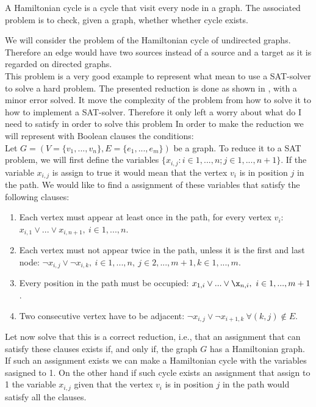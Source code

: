 \begin{definition}
  A Hamiltonian cycle is a cycle that visit every node in a graph. The associated problem is to check, given a graph, whether whether cycle exists.
\end{definition}

We will consider the problem of the Hamiltonian cycle of undirected graphs. Therefore an edge would have two sources instead of a source and a target as it is regarded on directed graphs.\\

This problem is a very good example to represent what mean to use a SAT-solver to solve a hard problem. The presented reduction is done as shown in \cite{49593}, with a minor error solved. It move the complexity of the problem from how to solve it to how to implement a SAT-solver. Therefore it only left a worry about what do I need to satisfy in order to solve this problem In order to make the reduction we will represent with Boolean clauses the conditions:\\

Let $G=(V=\{ v_1,...,v_n\},E= \{e_1,...,e_m\})$ be a graph. To reduce it to a SAT problem, we will first define the variables $\{x_{i,j}: i\in 1,...,n ; j\in 1,...,n+1 \}$. If the variable $x_{i,j}$ is assign to true it would mean that the vertex $v_i$ is in position $j$ in the path. We would like to find a assignment of these variables that satisfy the following clauses:

\begin{enumerate}
\item Each vertex must appear at least once in the path, for every vertex $v_i$:
  $ x_{i,1} \vee ... \vee x_{i,n +1},\ i \in 1,...,n$.
\item Each vertex must not appear twice in the path, unless it is the first and last node: $\neg x_{i,j} \vee \neg x_{i,k},\ i \in 1,...,n ,\ j \in 2,...,m+1, k \in 1,...,m$.
\item Every position in the path must be occupied:   $ x_{1,i} \vee ... \vee \x_{n,i},\ i \in 1,...,m+1$.
\item Two consecutive vertex have to be adjacent: $\neg x_{i,j} \vee \neg x_{i+1,k}\ \forall (k,j) \not \in E$.
\end{enumerate}

Let now solve that this is a correct reduction, i.e., that an assignment that can satisfy these clauses exists if, and only if, the graph $G$ has a Hamiltonian graph. If such an assignment exists we can make a Hamiltonian cycle with the variables sasigned to 1. On the other hand if such cycle exists an assignment that assign to 1 the variable $x_{i,j}$ given that the vertex $v_i$ is in position $j$ in the path would satisfy all the clauses. 

